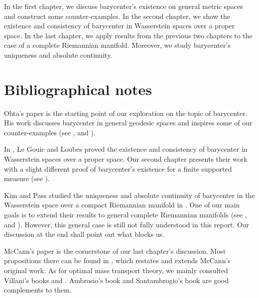 In the first chapter, we discuss barycenter's existence on general metric spaces and
construct some counter-examples.
In the second chapter, we show the existence and consistency of
barycenter in Wasserstein spaces over a proper space.
In the last chapter, we apply results from the previous two chapters
to the case of a complete Riemannian manifold.
Moreover, we study barycenter's uniqueness and absolute continuity.


\section*{Bibliographical notes}

Ohta's paper \cite{ohta2012barycenters} is the starting point of our exploration on the topic of barycenter.
His work discusses barycenter in general geodesic spaces and inspires some of our counter-examples
(see ,  and ).

In \cite{le2017existence}, Le Gouic and Loubes proved the existence and consistency of barycenter in Wasserstein spaces
over a proper space.
Our second chapter presents their work with a slight different proof of barycenter's existence
for a finite supported measure (see ).

Kim and Pass studied the uniqueness and absolute continuity
of barycenter in the Wasserstein space over a compact Riemannian manifold in \cite{KIM2017640}.
One of our main goals is to extend their results to general complete Riemannian manifolds
(see ,  and ).
However, this general case is still not fully understood in this report.
Our discussion at the end shall point out what blocks us.

McCann's paper \cite{mccann2001polar} is the cornerstone of our last chapter's discussion.
Most propositions there can be found in \cite{cordero2001riemannian},
which restates and extends McCann's original work.
As for optimal mass transport theory, we mainly consulted Villani's
books \cite{villani2008optimal} and \cite{villani2003topics}.
Ambrosio's book \cite{ambrosio2005gradient} and Santambrogio's book \cite{Santambrogio2015} are good complements to them.
